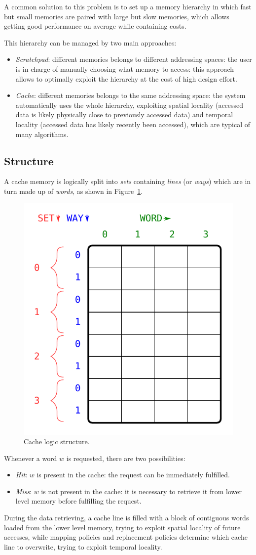\documentclass[11pt,a4paper,oneside]{memoir}
\begin{document}
A common solution to this problem is to set up a memory hierarchy in
which fast but small memories are paired with large but slow memories, which
allows getting good performance on average while containing costs.

This hierarchy can be managed by two main approaches:
\begin{itemize}
	\item \emph{Scratchpad}: different memories belongs to different
		addressing spaces: the user is in charge of manually choosing
		what memory to access: this approach allows to optimally
		exploit the hierarchy at the cost of high design effort.
	\item \emph{Cache}: different memories belongs to the same addressing
		space: the system automatically uses the whole hierarchy,
		exploiting spatial locality (accessed data is likely physically
		close to previously accessed data) and temporal locality
		(accessed data has likely recently been accessed), which are
		typical of many algorithms.
\end{itemize}

\subsection{Structure}
A cache memory is logically split into \emph{sets} containing \emph{lines} (or
\emph{ways}) which are in turn made up of \emph{words}, as shown in
Figure~\ref{fig:cache_logic_structure}.

\begin{figure}[!htb]
	\centering
	\includegraphics[width=.5\textwidth]{cache_logic_structure}
	\caption{Cache logic structure.}
	\label{fig:cache_logic_structure}
\end{figure}

Whenever a word $w$ is requested, there are two possibilities:
\begin{itemize}
	\item \emph{Hit}: $w$ is present in the cache: the request can be
		immediately fulfilled.
	\item \emph{Miss}: $w$ is not present in the cache: it is necessary to
		retrieve it from lower level memory before fulfilling the
		request.
\end{itemize}
During the data retrieving, a cache line is filled with a block of contiguous
words loaded from the lower level memory, trying to exploit spatial locality of
future accesses, while mapping policies and replacement policies determine which
cache line to overwrite, trying to exploit temporal locality.
\end{document}
